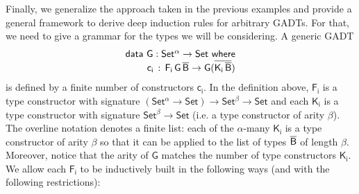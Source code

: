 \documentclass[9pt]{entcs}
\begin{document}
Finally, we generalize the approach taken in the previous examples and
provide a general framework to derive deep induction rules for
arbitrary GADTs.  For that, we need to give a grammar for the types we
will be considering.  A generic GADT
\begin{equation*}
\begin{array}{l}
\mathsf{data\ G : Set^\alpha \to Set\ where}\\
\mathsf{\;\;\;\;\;\;\;\;c_i\, :\, F_i\,G\,\overline{B} \to G (\overline{K_i\,\overline{B}})}
\end{array}
\end{equation*}
is defined by a finite number of constructors $\mathsf{c_i}$.
In the definition above, $\mathsf{F_i}$ is a type constructor with signature $\mathsf{(Set^{\alpha} \to Set) \to Set^{\beta} \to Set}$
and each $\mathsf{K_i}$ is a type constructor with signature $\mathsf{Set^{\beta} \to Set}$
(i.e. a type constructor of arity $\mathsf{\beta}$).
The overline notation denotes a finite list:
each of the $\mathsf{\alpha}$-many $\mathsf{K_i}$ is a type constructor of arity $\mathsf{\beta}$
so that it can be applied to the list of types $\mathsf{\overline{B}}$ of length $\mathsf{\beta}$.
Moreover, notice that the arity of $\mathsf{G}$ matches the number of type constructors $\mathsf{K_i}$.
We allow each $\mathsf{F_i}$ to be inductively built in the following ways (and with the following restrictions):
\end{document}
